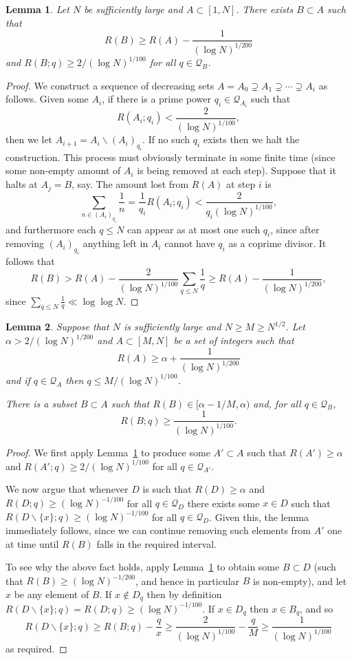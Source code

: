 \documentclass{amsart}
\newtheorem{lemma}{Lemma}
\begin{document}
\begin{lemma}\label{lem-pisqa}
Let $N$ be sufficiently large and $A\subset [1,N]$. There exists $B\subset A$ such that 
\[R(B)\geq  R(A)-\frac{1}{(\log N)^{1/200}}\]
and $R(B;q)\geq 2/(\log N)^{1/100}$ for all $q\in \mathcal{Q}_B$. 
\end{lemma}
\begin{proof}
We construct a sequence of decreasing sets $A=A_0\supsetneq A_1\supsetneq\cdots \supsetneq A_i$ as follows. Given some $A_i$, if there is a prime power $q_i\in\mathcal{Q}_{A_i}$ such that 
\[R(A_i;q_i)< \frac{2}{(\log N)^{1/100}},\]
then we let $A_{i+1}=A_i\backslash (A_i)_{q_i}$. If no such $q_i$ exists then we halt the construction. This process must obviously terminate in some finite time (since some non-empty amount of $A_i$ is being removed at each step). Suppose that it halts at $A_j=B$, say. The amount lost from $R(A)$ at step $i$ is
\[\sum_{n\in (A_i)_{q_i}}\frac{1}{n}=\frac{1}{q_i}R(A_i;q_i)< \frac{2}{q_i(\log N)^{1/100}},\]
and furthermore each $q\leq N$ can appear as at most one such $q_i$, since after removing $(A_i)_{q_i}$ anything left in $A_i$ cannot have $q_i$ as a coprime divisor. It follows that
\[R(B)> R(A) -\frac{2}{(\log N)^{1/100}}\sum_{q\leq N}\frac{1}{q}\geq R(A)-\frac{1}{(\log N)^{1/200}},\]
since $\sum_{q\leq N}\frac{1}{q}\ll \log\log N$.
\end{proof}
\begin{lemma}\label{lem-pisq}
Suppose that $N$ is sufficiently large and $N\geq M\geq N^{1/2}$. Let $\alpha > 2/(\log N)^{1/200}$ and $A\subset [M,N]$ be a set of integers such that
\[R(A) \geq \alpha+\frac{1}{(\log N)^{1/200}}\]
and if $q\in\mathcal{Q}_A$ then $q\leq M/(\log N)^{1/100}$.

There is a subset $B\subset A$ such that $R(B)\in [\alpha-1/M,\alpha)$ and, for all $q\in \mathcal{Q}_B$, 
\[R(B;q)\geq \frac{1}{(\log N)^{1/100}}.\]
\end{lemma}
\begin{proof}
We first apply Lemma~\ref{lem-pisqa} to produce some $A'\subset A$ such that $R(A')\geq \alpha$ and $R(A';q) \geq 2/(\log N)^{1/100}$ for all $q\in\mathcal{Q}_{A'}$. 

We now argue that whenever $D$ is such that $R(D)\geq \alpha$ and $R(D;q) \geq (\log N)^{-1/100}$ for all $q\in \mathcal{Q}_D$ there exists some $x\in D$ such that $R(D\backslash \{x\};q)\geq (\log N)^{-1/100}$ for all $q\in\mathcal{Q}_{D}$. Given this, the lemma immediately follows, since we can continue removing such elements from $A'$ one at time until $R(B)$ falls in the required interval. 

To see why the above fact holds, apply Lemma~\ref{lem-pisqa} to obtain some $B\subset D$ (such that $R(B)\geq (\log N)^{-1/200}$, and hence in particular $B$ is non-empty), and let $x$ be any element of $B$. If $x\not\in D_q$ then by definition $R(D\backslash\{x\};q)=R(D;q)\geq (\log N)^{-1/100}$. If $x\in D_q$ then $x\in B_q$, and so
\[R(D\backslash\{x\};q)\geq R(B;q)-\frac{q}{x}\geq \frac{2}{(\log N)^{1/100}}-\frac{q}{M}\geq \frac{1}{(\log N)^{1/100}}\]
as required.
\end{proof}
\end{document}
